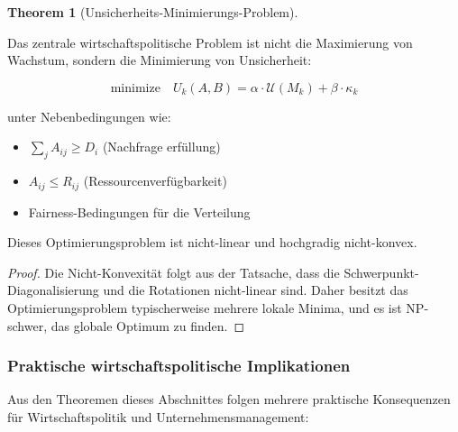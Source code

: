 \documentclass[a4paper,12pt]{article}
\theoremstyle{definition}
\newtheorem{theorem}{Theorem}
\begin{document}
\begin{theorem}[Unsicherheits-Minimierungs-Problem]
\label{thm:unsicherheit_minimierung}

Das zentrale wirtschaftspolitische Problem ist nicht die Maximierung von Wachstum, sondern die Minimierung von Unsicherheit:

\begin{equation}
\text{minimize} \quad U_k(A, B) = \alpha \cdot \mathcal{U}(M_k) + \beta \cdot \kappa_k
\end{equation}

unter Nebenbedingungen wie:

\begin{itemize}
\item $\sum_j A_{ij} \geq D_i$ (Nachfrage erfüllung)
\item $A_{ij} \leq R_{ij}$ (Ressourcenverfügbarkeit)
\item Fairness-Bedingungen für die Verteilung
\end{itemize}

Dieses Optimierungsproblem ist nicht-linear und hochgradig nicht-konvex.

\end{theorem}

\begin{proof}

Die Nicht-Konvexität folgt aus der Tatsache, dass die Schwerpunkt-Diagonalisierung und die Rotationen nicht-linear sind. Daher besitzt das Optimierungsproblem typischerweise mehrere lokale Minima, und es ist NP-schwer, das globale Optimum zu finden.

\end{proof}

\subsubsection{Praktische wirtschaftspolitische Implikationen}

Aus den Theoremen dieses Abschnittes folgen mehrere praktische Konsequenzen für Wirtschaftspolitik und Unternehmensmanagement:
\end{document}
